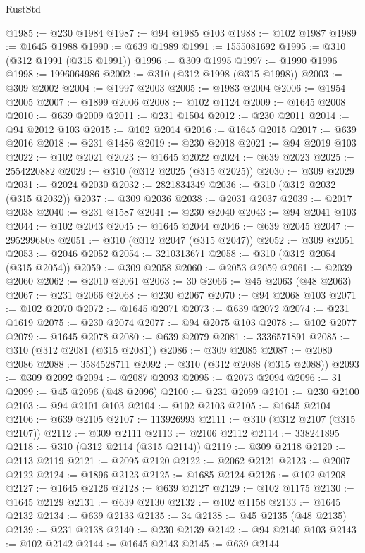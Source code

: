 \begin{lexlean}{RustStd}
\begin{coremodule}
@1985 := @230 @1984
@1987 := @94 @1985 @103
@1988 := @102 @1987
@1989 := @1645 @1988
@1990 := @639 @1989
@1991 := 1555081692
@1995 := @310 (@312 @1991 (@315 @1991))
@1996 := @309 @1995
@1997 := @1990 @1996
@1998 := 1996064986
@2002 := @310 (@312 @1998 (@315 @1998))
@2003 := @309 @2002
@2004 := @1997 @2003
@2005 := @1983 @2004
@2006 := @1954 @2005
@2007 := @1899 @2006
@2008 := @102 @1124
@2009 := @1645 @2008
@2010 := @639 @2009
@2011 := @231 @1504
@2012 := @230 @2011
@2014 := @94 @2012 @103
@2015 := @102 @2014
@2016 := @1645 @2015
@2017 := @639 @2016
@2018 := @231 @1486
@2019 := @230 @2018
@2021 := @94 @2019 @103
@2022 := @102 @2021
@2023 := @1645 @2022
@2024 := @639 @2023
@2025 := 2554220882
@2029 := @310 (@312 @2025 (@315 @2025))
@2030 := @309 @2029
@2031 := @2024 @2030
@2032 := 2821834349
@2036 := @310 (@312 @2032 (@315 @2032))
@2037 := @309 @2036
@2038 := @2031 @2037
@2039 := @2017 @2038
@2040 := @231 @1587
@2041 := @230 @2040
@2043 := @94 @2041 @103
@2044 := @102 @2043
@2045 := @1645 @2044
@2046 := @639 @2045
@2047 := 2952996808
@2051 := @310 (@312 @2047 (@315 @2047))
@2052 := @309 @2051
@2053 := @2046 @2052
@2054 := 3210313671
@2058 := @310 (@312 @2054 (@315 @2054))
@2059 := @309 @2058
@2060 := @2053 @2059
@2061 := @2039 @2060
@2062 := @2010 @2061
@2063 := 30
@2066 := @45 @2063 (@48 @2063)
@2067 := @231 @2066
@2068 := @230 @2067
@2070 := @94 @2068 @103
@2071 := @102 @2070
@2072 := @1645 @2071
@2073 := @639 @2072
@2074 := @231 @1619
@2075 := @230 @2074
@2077 := @94 @2075 @103
@2078 := @102 @2077
@2079 := @1645 @2078
@2080 := @639 @2079
@2081 := 3336571891
@2085 := @310 (@312 @2081 (@315 @2081))
@2086 := @309 @2085
@2087 := @2080 @2086
@2088 := 3584528711
@2092 := @310 (@312 @2088 (@315 @2088))
@2093 := @309 @2092
@2094 := @2087 @2093
@2095 := @2073 @2094
@2096 := 31
@2099 := @45 @2096 (@48 @2096)
@2100 := @231 @2099
@2101 := @230 @2100
@2103 := @94 @2101 @103
@2104 := @102 @2103
@2105 := @1645 @2104
@2106 := @639 @2105
@2107 := 113926993
@2111 := @310 (@312 @2107 (@315 @2107))
@2112 := @309 @2111
@2113 := @2106 @2112
@2114 := 338241895
@2118 := @310 (@312 @2114 (@315 @2114))
@2119 := @309 @2118
@2120 := @2113 @2119
@2121 := @2095 @2120
@2122 := @2062 @2121
@2123 := @2007 @2122
@2124 := @1896 @2123
@2125 := @1685 @2124
@2126 := @102 @1208
@2127 := @1645 @2126
@2128 := @639 @2127
@2129 := @102 @1175
@2130 := @1645 @2129
@2131 := @639 @2130
@2132 := @102 @1158
@2133 := @1645 @2132
@2134 := @639 @2133
@2135 := 34
@2138 := @45 @2135 (@48 @2135)
@2139 := @231 @2138
@2140 := @230 @2139
@2142 := @94 @2140 @103
@2143 := @102 @2142
@2144 := @1645 @2143
@2145 := @639 @2144

\end{coremodule}
\end{lexlean}
